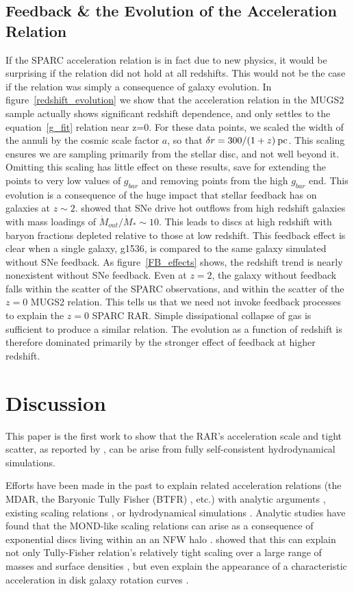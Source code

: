 \subsection{Feedback \& the Evolution of the Acceleration Relation}
If the SPARC acceleration relation is in fact due to new physics, it would be
surprising if the relation did not hold at all redshifts.  This would not be the case
if the relation was simply a consequence of galaxy evolution.  In
figure~\ref{redshift_evolution} we show that the acceleration relation in the
MUGS2 sample actually shows significant redshift
dependence, and only settles to the equation~\ref{g_fit} relation near z=0.  For
these data points, we scaled the width of the annuli by the cosmic scale
factor $a$, so that $\delta r = 300/(1+z)\>{\rm pc}$. This scaling ensures we are
sampling primarily from the stellar disc, and not well beyond it.  Omitting this
scaling has little effect on these results, save for extending the points to
very low values of $g_{bar}$ and removing points from the high $g_{bar}$ end.
This evolution is a consequence of the huge impact that stellar feedback has on
galaxies at $z\sim2$.  \citet{Keller2015} showed that SNe drive hot outflows
from high redshift galaxies with mass loadings of $\dot M_{out}/\dot M_* \sim
10$.  This leads to discs at high redshift with baryon fractions depleted
relative to those at low redshift.  This feedback effect is clear when a single
galaxy, g1536, is compared to the same galaxy simulated without SNe feedback.
As figure~\ref{FB_effects} shows, the redshift trend is nearly nonexistent
without SNe feedback.  Even at $z=2$, the galaxy without feedback falls within
the scatter of the SPARC observations, and within the scatter of the $z=0$
MUGS2 relation.  This tells us that we need not invoke feedback processes to
explain the $z=0$ SPARC RAR.  Simple dissipational collapse of gas is
sufficient to produce a similar relation.  The evolution as a function of
redshift is therefore dominated primarily by the stronger effect of feedback at
higher redshift.

\section{Discussion}
This paper is the first work to show that the RAR's acceleration scale and tight
scatter, as reported by \citet{McGaugh2016}, can be arise from fully
self-consistent hydrodynamical simulations.

Efforts have been made in the past to explain related acceleration relations
(the MDAR, the Baryonic Tully Fisher (BTFR) \citep{McGaugh2000}, etc.) with
analytic arguments \citet{VanDenBosch2000,Kaplinghat2002}, existing scaling
relations \citep{DiCintio2016}, or hydrodynamical simulations
\citep{SantosSantos2016}.  Analytic studies have found that the MOND-like
scaling relations can arise as a consequence of exponential discs living within
an an NFW halo \citep{VanDenBosch2000}.  \citet{VanDenBosch2000} showed that
this can explain not only Tully-Fisher relation's relatively tight scaling over
a large range of masses and surface densities \citep{McGaugh1998}, but even
explain the appearance of a characteristic acceleration in disk galaxy rotation
curves \citep{McGaugh1999}.

